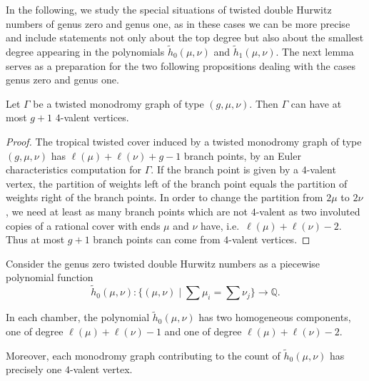 In the following, we study the special situations of twisted double Hurwitz numbers of genus zero and genus one, as in these cases we can be more precise and include statements not only about the top degree but also about the smallest degree appearing in the polynomials $\tilde{h}_0(\mu,\nu)$ and $\tilde{h}_1(\mu,\nu)$. The next lemma serves as a preparation for the two following propositions dealing with the cases genus zero and genus one.
 
\begin{lemma}\label{lem-g+1}
Let $\Gamma$ be a twisted monodromy graph of type $(g,\mu,\nu)$. Then $\Gamma$ can have at most $g+1$ $4$-valent vertices.
\end{lemma}

\begin{proof}
The tropical twisted cover induced by a twisted monodromy graph of type $(g,\mu,\nu)$ has $\ell(\mu)+\ell(\nu)+g-1$ branch points, by an Euler characteristics computation for $\Gamma$. If the branch point is given by a $4$-valent vertex, the partition of weights left of the branch point equals the partition of weights right of the branch points. In order to change the partition from $2\mu$ to $2\nu$, we need at least as many branch points which are not $4$-valent as two involuted copies of a rational cover with ends $\mu$ and $\nu$ have, i.e.\ $\ell(\mu)+\ell(\nu)-2$. Thus at most $g+1$ branch points can come from $4$-valent vertices.
\end{proof}
 
 \begin{prop}\label{prop-ppingenus0}
 Consider the genus zero twisted double Hurwitz numbers as a piecewise polynomial function 
$$\tilde{h}_0(\mu,\nu):\Big\{(\mu,\nu) \mid \sum \mu_i=\sum\nu_j\Big\} \longrightarrow\mathbb{Q}.$$ 

In each chamber, the polynomial $\tilde{h}_0(\mu,\nu)$ has two homogeneous components, one of degree $\ell(\mu)+\ell(\nu)-1$ and one of degree $\ell(\mu)+\ell(\nu)-2$.

Moreover, each monodromy graph contributing to the count of  $\tilde{h}_0(\mu,\nu)$ has precisely one $4$-valent vertex.
 \end{prop}
 
